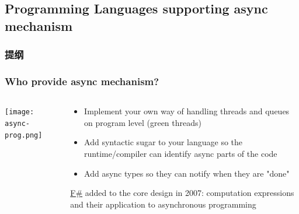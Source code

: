 \subsection{Programming Languages supporting async mechanism}
\begin{frame}
    \frametitle{提纲} %
    \tableofcontents %

\end{frame}
\begin{frame}[fragile]	
    \frametitle{Who provide async mechanism?}
    \begin{columns}
        \begin{column}{.4\textwidth}
            \centering
            
            \texttt{[image: async-prog.png]}
            
            
        \end{column}
        
        \begin{column}{.6\textwidth}
            \begin{itemize}
                
                \item Implement your own way of handling threads and queues on program level (green threads)
                \item Add syntactic sugar to your language so the runtime/compiler can identify async parts of the code
                \item Add async types so they can notify when they are "done"
                
            \end{itemize}
             \href{https://docs.microsoft.com/en-us/dotnet/fsharp/what-is-fsharp}{F\#} added to the core design in 2007: computation expressions and their application to asynchronous programming
        \end{column}
    \end{columns}
\end{frame}


